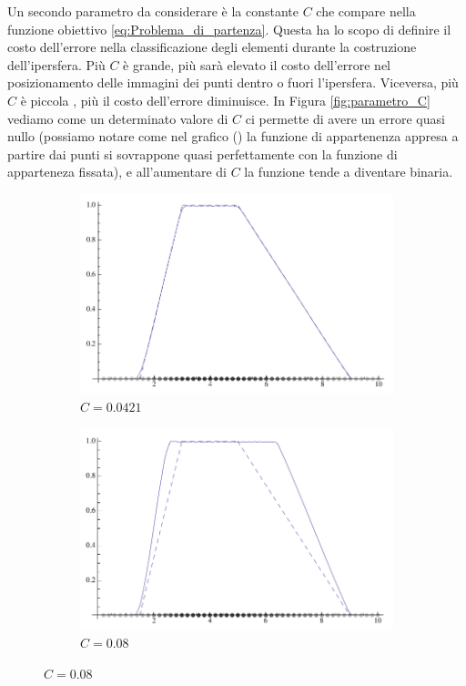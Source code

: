 \documentclass[a4paper,12pt]{report}
\begin{document}
\noindent Un secondo parametro da considerare è la constante $C$ che compare nella funzione obiettivo \ref{eq:Problema_di_partenza}. Questa ha lo scopo di definire il costo dell'errore nella classificazione degli elementi durante la costruzione dell'ipersfera. Più $C$ è grande, più sarà elevato il costo dell'errore nel posizionamento delle immagini dei punti dentro o fuori l'ipersfera. Viceversa, più $C$ è piccola , più il costo dell'errore diminuisce. In Figura \ref{fig:parametro_C} vediamo come un determinato valore di $C$ ci permette di avere un errore quasi nullo (possiamo notare come nel grafico () la funzione di appartenenza appresa a partire dai punti si sovrappone quasi perfettamente con la funzione di apparteneza fissata), e all'aumentare di $C$ la funzione tende a diventare binaria.

\begin{figure}[h]
    \begin{subfigure}[t]{0.32\textwidth}
       \centering
       \includegraphics[scale=0.18]{images/parametro_C_1.png}
       \caption{$C = 0.0421 $}
       \label{fig:C_1}

    \end{subfigure}
    \begin{subfigure}[t]{0.32\textwidth}
        \centering
        \includegraphics[scale=0.18]{images/parametro_C_2.png} 
        \caption{$C = 0.08 $}
        \label{fig:C_2}


\end{subfigure}
\end{figure}
\end{document}
